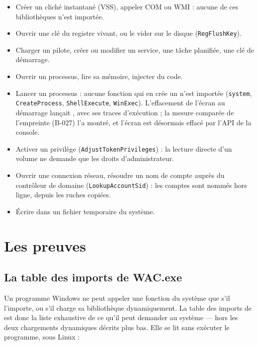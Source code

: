 \documentclass[11pt,a4paper,oneside]{report}
\begin{document}
\begin{itemize}
  \item Créer un cliché instantané (VSS), appeler COM ou WMI : aucune de ces
        bibliothèques n'est importée.
  \item Ouvrir une clé du registre vivant, ou le vider sur le disque
        (\texttt{RegFlushKey}).
  \item Charger un pilote, créer ou modifier un service, une tâche planifiée,
        une clé de démarrage.
  \item Ouvrir un processus, lire sa mémoire, injecter du code.
  \item Lancer un processus : aucune fonction qui en crée un n'est importée
        (\texttt{system}, \texttt{CreateProcess}, \texttt{ShellExecute},
        \texttt{WinExec}). L'effacement de l'écran au démarrage lançait
        , avec ses traces d'exécution ; la mesure
        comparée de l'empreinte (B-027) l'a montré, et l'écran est désormais
        effacé par l'API de la console.
  \item Activer un privilège (\texttt{AdjustTokenPrivileges}) : la lecture
        directe d'un volume ne demande que les droits d'administrateur.
  \item Ouvrir une connexion réseau, résoudre un nom de compte auprès du
        contrôleur de domaine (\texttt{LookupAccountSid}) : les comptes sont
        nommés hors ligne, depuis les ruches copiées.
  \item Écrire dans un fichier temporaire du système.
\end{itemize}

\chapter{Les preuves}\label{ch:preuves}

\section{La table des imports de WAC.exe}

Un programme Windows ne peut appeler une fonction du système que s'il
l'importe, ou s'il charge sa bibliothèque dynamiquement. La table des imports
de  est donc la liste exhaustive de ce qu'il peut demander au
système — hors les deux chargements dynamiques décrits plus bas. Elle se lit
sans exécuter le programme, sous Linux :
\end{document}
